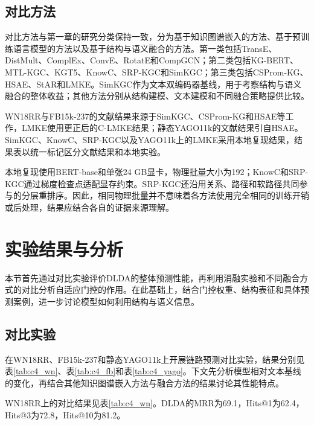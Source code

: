 \subsection{对比方法}

对比方法与第一章的研究分类保持一致，分为基于知识图谱嵌入的方法、基于预训练语言模型的方法以及基于结构与语义融合的方法。第一类包括TransE、DistMult、ComplEx、ConvE、RotatE和CompGCN；第二类包括KG-BERT、MTL-KGC、KGT5、KnowC、SRP-KGC和SimKGC；第三类包括CSProm-KG、HSAE、StAR和LMKE。SimKGC作为文本双编码器基线，用于考察结构与语义融合的整体收益；其他方法分别从结构建模、文本建模和不同融合策略提供比较。

WN18RR与FB15k-237的文献结果来源于SimKGC、CSProm-KG和HSAE等工作，LMKE使用更正后的C-LMKE结果；静态YAGO11k的文献结果引自HSAE\cite{wang2022simkgc,chen2023cspromkg,xue2025hsae,wang2022language}。SimKGC、KnowC、SRP-KGC以及YAGO11k上的LMKE采用本地复现结果，结果表以统一标记区分文献结果和本地实验。

本地复现使用BERT-base和单张24 GB显卡，物理批量大小为192；KnowC和SRP-KGC通过梯度检查点适配显存约束。SRP-KGC还沿用关系、路径和软路径共同参与的分层重排序。因此，相同物理批量并不意味着各方法使用完全相同的训练开销或后处理，结果应结合各自的证据来源理解。

\section{实验结果与分析}

本节首先通过对比实验评价DLDA的整体预测性能，再利用消融实验和不同融合方式的对比分析自适应门控的作用。在此基础上，结合门控权重、结构表征和具体预测案例，进一步讨论模型如何利用结构与语义信息。

\subsection{对比实验}

在WN18RR、FB15k-237和静态YAGO11k上开展链路预测对比实验，结果分别见表\ref{tab:c4_wn}、表\ref{tab:c4_fb}和表\ref{tab:c4_yago}。下文先分析模型相对文本基线的变化，再结合其他知识图谱嵌入方法与融合方法的结果讨论其性能特点。

WN18RR上的对比结果见表\ref{tab:c4_wn}。DLDA的MRR为69.1，Hits@1为62.4，Hits@3为72.8，Hits@10为81.2。

